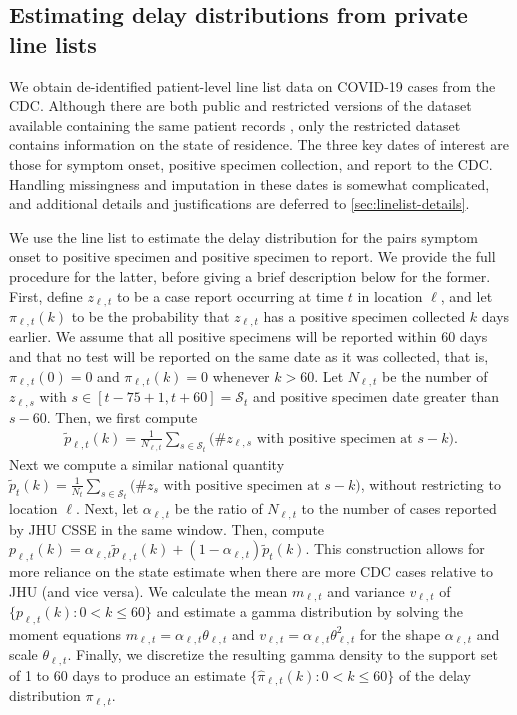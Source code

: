 \subsection{Estimating delay distributions from private line lists}
\label{sec:delaystop}

We obtain de-identified patient-level line list data on COVID-19 cases from the
CDC. Although there are both public and restricted versions of the dataset
available containing the same patient records \citep{cdc2020casepub,
cdc2020caserestr}, only the restricted dataset contains information on the state
of residence. The three key dates of interest are those for symptom onset,
positive specimen collection, and report to the CDC. Handling missingness and
imputation in these dates is somewhat complicated, and additional details and
justifications are deferred to \autoref{sec:linelist-details}.

We use the line list to estimate the delay distribution for the pairs symptom
onset to positive specimen and positive specimen to report. We provide the full
procedure for the latter, before giving a brief description below for the
former. First, define $z_{\ell,t}$ to be a case report occurring at time $t$ in
location $\ell$, and let $\pi_{\ell,t}(k)$ to be the probability that
$z_{\ell,t}$ has a positive specimen collected $k$ days earlier. We assume that
all positive specimens will be reported within 60 days and that no test will be
reported on the same date as it was collected, that is, $\pi_{\ell,t}(0) = 0$
and $\pi_{\ell,t}(k) = 0$ whenever $k > 60$. Let $N_{\ell,t}$ be the number of
$z_{\ell,s}$ with $s\in[t-75+1,t+60] = \mathcal{S}_t$ and positive specimen date
greater than $s-60$. Then, we first compute
\begin{align}
    \tilde{p}_{\ell,t}(k) = \frac{1}{N_{\ell,t}}\sum_{s \in \mathcal{S}_t}
    \big(\textrm{\# $z_{\ell,s}$ with positive specimen at $s-k$}\big).
\end{align}
Next we compute a similar national quantity $\tilde{p}_{t}(k) =
\frac{1}{N_{t}}\sum_{s \in \mathcal{S}_t} \big(\textrm{\# $z_{s}$ with positive
specimen at $s-k$}\big)$, without restricting to location $\ell$. Next, let
$\alpha_{\ell,t}$ be the ratio of $N_{\ell,t}$ to the number of cases reported
by JHU CSSE\cite{dong2020interactive} in the same window. Then, compute
$p_{\ell,t}(k) = \alpha_{\ell,t}\tilde{p}_{\ell,t}(k) +
(1-\alpha_{\ell,t})\tilde{p}_t(k)$. This construction allows for more reliance
on the state estimate when there are more CDC cases relative to JHU (and vice
versa). We calculate the mean $m_{\ell,t}$ and variance $v_{\ell,t}$ of
$\{p_{\ell,t}(k) : 0<k\leq 60\}$ and estimate a gamma distribution by solving
the moment equations $m_{\ell,t} = \alpha_{\ell,t}\theta_{\ell,t}$ and
$v_{\ell,t}= \alpha_{\ell,t}\theta_{\ell,t}^2$ for the shape $\alpha_{\ell,t}$
and scale $\theta_{\ell,t}$. Finally, we discretize the resulting gamma density
to the support set of 1 to 60 days to produce an estimate
$\{\widehat{\pi}_{\ell,t}(k): 0 < k \leq 60\}$ of the delay distribution
$\pi_{\ell,t}$.
 
